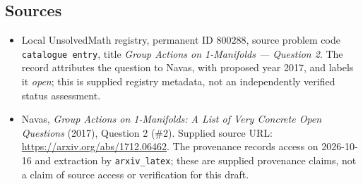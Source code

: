 \documentclass[11pt]{article}
\begin{document}
\subsection{Sources}
\begin{itemize}
\item Local UnsolvedMath registry, permanent ID \(800288\), source problem code \texttt{catalogue entry}, title \emph{Group Actions on 1-Manifolds --- Question 2}. The record attributes the question to Navas, with proposed year 2017, and labels it \emph{open}; this is supplied registry metadata, not an independently verified status assessment.
\item Navas, \emph{Group Actions on 1-Manifolds: A List of Very Concrete Open Questions} (2017), Question 2 (\#2). Supplied source URL: \url{https://arxiv.org/abs/1712.06462}. The provenance records access on 2026-10-16 and extraction by \texttt{arxiv\_latex}; these are supplied provenance claims, not a claim of source access or verification for this draft.
\end{itemize}
\end{document}
